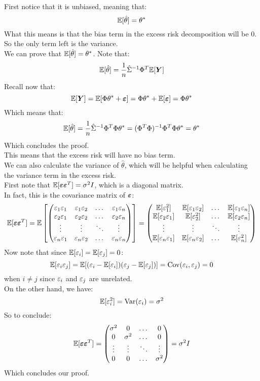 \documentclass[12pt]{article}
\begin{document}
First notice that it is unbiased, meaning that:
\[ \mathbb{E}[\hat{\theta}] = \theta^* \]
What this means is that the bias term in
the excess risk decomposition will be $0$. \\
So the only term left is the variance. \\

We can prove that $\mathbb{E}[\hat{\theta}] = \theta^*$.
Note that:
\[ \mathbb{E}[\hat{\theta}]
= \dfrac{1}{n} \hat{\Sigma}^{-1} \Phi^T \mathbb{E}[\boldsymbol{Y}] \]
Recall now that:
\[ \mathbb{E}[\boldsymbol{Y}] 
= \mathbb{E}[\Phi \theta^* + \boldsymbol{\varepsilon}]
= \Phi \theta^* + \mathbb{E}[\boldsymbol{\varepsilon}] = \Phi \theta^* \]
Which means that:
\[ \mathbb{E}[\hat{\theta}] = 
\dfrac{1}{n} \hat{\Sigma}^{-1} \Phi^T \Phi \theta^*
= (\Phi^T\Phi)^{-1} \Phi^T \Phi \theta^* 
= \theta^* \]
Which concludes the proof. \\

This means that the excess risk will have no bias
term. \\

We can also calculate the variance
of $\hat{\theta}$, which will be helpful
when calculating the variance term in the 
excess risk. \\

First note that $\mathbb{E}[\boldsymbol{\varepsilon} \boldsymbol{\varepsilon}^T]
= \sigma^2I$, which is a diagonal matrix. \\
In fact, this is the covariance
matrix of $\boldsymbol{\varepsilon}$:
\[ \mathbb{E}[\boldsymbol{\varepsilon} \boldsymbol{\varepsilon}^T]
= \mathbb{E}\left[ \begin{pmatrix} \varepsilon_1\varepsilon_1 & \varepsilon_1\varepsilon_2 & \dots 
& \varepsilon_1\varepsilon_n \\ 
\varepsilon_2\varepsilon_1 & \varepsilon_2\varepsilon_2 & \dots & \varepsilon_2\varepsilon_n \\ 
\vdots &\vdots &\ddots & \vdots \\
\varepsilon_n\varepsilon_1 & \varepsilon_n\varepsilon_2 & \dots 
& \varepsilon_n\varepsilon_n  \end{pmatrix} \right]
= \begin{pmatrix} \mathbb{E}[\varepsilon_1^2] & \mathbb{E}[\varepsilon_1\varepsilon_2] 
& \dots & \mathbb{E}[\varepsilon_1\varepsilon_n] \\ 
\mathbb{E}[\varepsilon_2\varepsilon_1] & \mathbb{E}[\varepsilon_2^2] & 
\dots & \mathbb{E}[\varepsilon_2\varepsilon_n] \\ 
\vdots &\vdots &\ddots & \vdots \\
\mathbb{E}[\varepsilon_n\varepsilon_1] & \mathbb{E}[\varepsilon_n\varepsilon_2] & \dots & 
\mathbb{E}[\varepsilon_n^2]  \end{pmatrix} \]
Now note that since 
$\mathbb{E}[\varepsilon_i] = \mathbb{E}[\varepsilon_j] = 0$:
\[ \mathbb{E}[\varepsilon_i\varepsilon_j] = \mathbb{E}[(\varepsilon_i - \mathbb{E}[\varepsilon_i])
(\varepsilon_j - \mathbb{E}[\varepsilon_j])] = \text{Cov}(\varepsilon_i, \varepsilon_j) = 0 \]
when $i \neq j$ since $\varepsilon_i$ and $\varepsilon_j$
are unrelated. \\
On the other hand, we have:
\[ \mathbb{E}[\varepsilon_i^2] = \text{Var}(\varepsilon_i) = \sigma^2 \]
So to conclude:
\[ \mathbb{E}[\boldsymbol{\varepsilon} \boldsymbol{\varepsilon}^T] 
= \begin{pmatrix} \sigma^2 & 0 & \dots & 0 \\ 
0 & \sigma^2 & \dots & 0 \\ 
\vdots &\vdots &\ddots & \vdots \\
0 & 0 & \dots & \sigma^2  \end{pmatrix} = \sigma^2I \]
Which concludes our proof. \\
\end{document}

